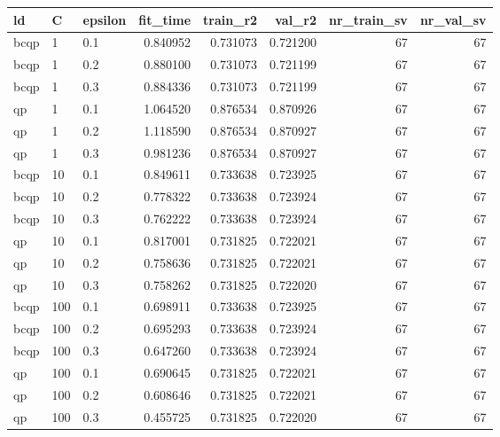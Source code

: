 \begin{tabular}{lllrrrrr}
\toprule
  ld &   C & epsilon &  fit\_time &  train\_r2 &   val\_r2 &  nr\_train\_sv &  nr\_val\_sv \\
\midrule
bcqp &   1 &     0.1 &  0.840952 &  0.731073 & 0.721200 &           67 &         67 \\
bcqp &   1 &     0.2 &  0.880100 &  0.731073 & 0.721199 &           67 &         67 \\
bcqp &   1 &     0.3 &  0.884336 &  0.731073 & 0.721199 &           67 &         67 \\
  qp &   1 &     0.1 &  1.064520 &  0.876534 & 0.870926 &           67 &         67 \\
  qp &   1 &     0.2 &  1.118590 &  0.876534 & 0.870927 &           67 &         67 \\
  qp &   1 &     0.3 &  0.981236 &  0.876534 & 0.870927 &           67 &         67 \\
bcqp &  10 &     0.1 &  0.849611 &  0.733638 & 0.723925 &           67 &         67 \\
bcqp &  10 &     0.2 &  0.778322 &  0.733638 & 0.723924 &           67 &         67 \\
bcqp &  10 &     0.3 &  0.762222 &  0.733638 & 0.723924 &           67 &         67 \\
  qp &  10 &     0.1 &  0.817001 &  0.731825 & 0.722021 &           67 &         67 \\
  qp &  10 &     0.2 &  0.758636 &  0.731825 & 0.722021 &           67 &         67 \\
  qp &  10 &     0.3 &  0.758262 &  0.731825 & 0.722020 &           67 &         67 \\
bcqp & 100 &     0.1 &  0.698911 &  0.733638 & 0.723925 &           67 &         67 \\
bcqp & 100 &     0.2 &  0.695293 &  0.733638 & 0.723924 &           67 &         67 \\
bcqp & 100 &     0.3 &  0.647260 &  0.733638 & 0.723924 &           67 &         67 \\
  qp & 100 &     0.1 &  0.690645 &  0.731825 & 0.722021 &           67 &         67 \\
  qp & 100 &     0.2 &  0.608646 &  0.731825 & 0.722021 &           67 &         67 \\
  qp & 100 &     0.3 &  0.455725 &  0.731825 & 0.722020 &           67 &         67 \\
\bottomrule
\end{tabular}
